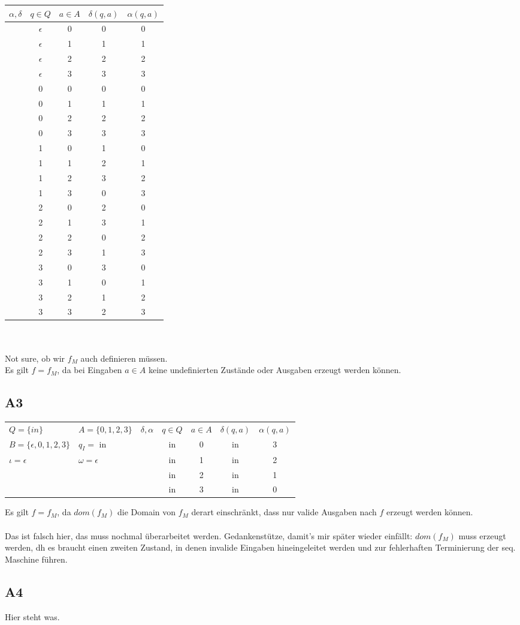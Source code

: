 \documentclass[12pt, a4paper]{article}
\begin{document}
\begin{tabular}{c | c c | c c}
    \(\alpha, \delta\)&\(q \in Q\)&\(a \in A\)&\(\delta(q,a)\)&\(\alpha(q,a)\)\\
    \hline
    &\(\epsilon\)&0&0&0\\
    &\(\epsilon\)&1&1&1\\
    &\(\epsilon\)&2&2&2\\
    &\(\epsilon\)&3&3&3\\
    &0&0&0&0\\
    &0&1&1&1\\
    &0&2&2&2\\
    &0&3&3&3\\
    &1&0&1&0\\
    &1&1&2&1\\
    &1&2&3&2\\
    &1&3&0&3\\
    &2&0&2&0\\
    &2&1&3&1\\
    &2&2&0&2\\
    &2&3&1&3\\
    &3&0&3&0\\
    &3&1&0&1\\
    &3&2&1&2\\
    &3&3&2&3\\
\end{tabular}\\\\
Not sure, ob wir \(f_M\) auch definieren müssen. \\
Es gilt \(f=f_M\), da bei Eingaben \(a\in A\) keine undefinierten Zustände oder Ausgaben erzeugt werden können.\\
\subsection*{A3}
\begin{tabular}{l l || c c c | c c}
    \(Q = \{ in \}\) & \(A = \{0,1,2,3 \}\) & \(\delta, \alpha\) & \(q\in Q\)& \(a \in A\) & \(\delta(q,a)\)&\(\alpha(q,a)\)\\
    \(B = \{ \epsilon, 0,1,2,3 \}\) & \(q_I =\) in && in & 0 & in & 3\\
    \(\iota = \epsilon\) & \(\omega = \epsilon\) && in & 1 & in & 2\\
    &&& in & 2 & in & 1\\
    &&& in & 3 & in & 0\\
\end{tabular}
Es gilt \(f = f_M\), da \(dom(f_M)\) die Domain von \(f_M\) derart einschränkt, dass nur valide Ausgaben nach \(f\) erzeugt werden können.\\
\\Das ist falsch hier, das muss nochmal überarbeitet werden. Gedankenstütze, damit's mir später wieder einfällt: \(dom(f_M)\) muss erzeugt werden, dh es braucht einen zweiten Zustand, in denen invalide Eingaben hineingeleitet werden und zur fehlerhaften Terminierung der seq. Maschine führen.\\
\subsection*{A4}
Hier steht was.
\end{document}
